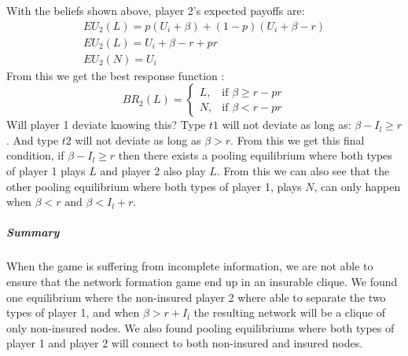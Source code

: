 With the beliefs shown above, player 2's expected payoffs are: \begin{eqnarray}
EU_{2}(L)=p(U_{i}+\beta)+(1-p)(U_{i}+\beta-r) \nonumber \\
EU_{2}(L)=U_{i}+\beta-r+pr \\
EU_{2}(N)=U_{i}
\end{eqnarray}
From this we get the best response function :
\begin{equation}
BR_{2}(L)=
\begin{cases}
	L,& \text{if } \beta\geq r-pr\\
   N,& \text{if } \beta<r-pr  
\end{cases}
\end{equation}
Will player 1 deviate knowing this?
Type $t1$ will not deviate as long as: $\beta - I_{l} \geq r$. And type $t2$ will not deviate as long as $\beta >r$.
From this we get this final condition, if $\beta-I_{l}\geq r$ then there exists a pooling equilibrium where both types of player 1 plays $L$ and player 2 also play $L$.
From this we can also see that the other pooling equilibrium where both types of player 1, plays $N$, can only happen when $\beta<r \text{ and } \beta<I_l+r$.

\subparagraph{Summary}
When the game is suffering from incomplete information, we are not able to ensure that the network formation game end up in an insurable clique. We found one equilibrium where the non-insured player 2 where able to separate the two types of player 1, and when $\beta>r+I_{l}$ the resulting network will be a clique of only non-insured nodes.
We also found pooling equilibriums where both types of player 1 and player 2 will connect to both non-insured and insured nodes. 
